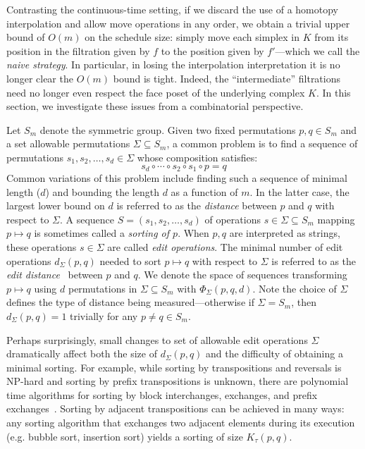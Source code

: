 \documentclass[sn-mathphys]{sn-jnl}
\begin{document}
Contrasting the continuous-time setting, if we discard the use of a homotopy interpolation and allow move operations in any order, we obtain a trivial upper bound of $O(m)$ on the schedule size:  simply move each simplex in $K$ from  its position in the filtration given by $f$ to the position given by $f'$---which we call the \emph{naive strategy}. In particular, in losing the interpolation interpretation it is no longer clear the $O(m)$ bound is tight. Indeed, the ``intermediate'' filtrations need no longer even respect the face poset of the underlying complex $K$. 
In this section, we investigate these issues from a combinatorial perspective. 


Let $S_m$ denote the symmetric group. Given two fixed permutations $p, q \in S_m$ and a set allowable permutations $\Sigma \subseteq S_m$,  a common  problem is to find a sequence of permutations $s_1, s_2, \dots, s_d \in \Sigma$ whose composition satisfies:
	\begin{equation}\label{eq:sorting}
		s_d \circ \cdots \circ s_2 \circ s_1 \circ p = q
	\end{equation}
Common variations of this problem include finding such a sequence of minimal length ($d$) and bounding the length $d$ as a function of $m$. In the latter case, the largest  lower bound on $d$ is referred to as the \emph{distance} between $p$ and $q$ with respect to $\Sigma$. 
A sequence $S = (s_1, s_2, \dots, s_d)$ of operations $s \in \Sigma \subseteq S_m$ mapping $p \mapsto q$ is sometimes called a \emph{sorting of $p$}. 
When $p, q$ are interpreted as strings, these operations $s \in \Sigma$ are called \emph{edit operations}. The minimal number of edit operations $d_\Sigma(p, q)$ needed to sort $p \mapsto q$ with respect to $\Sigma$ is referred to as the \emph{edit distance}~\cite{bergroth2000survey} between $p$ and $q$.
We denote the space of sequences transforming $p \mapsto q$ using $d$ permutations in $\Sigma \subseteq S_m$ with $\Phi_\Sigma(p,q,d)$.
Note the choice of $\Sigma$ defines the type of distance being measured---otherwise if $\Sigma = S_m$, then $d_\Sigma(p, q) = 1$ trivially for any $p\neq  q \in S_m$.

Perhaps surprisingly, small changes to set of allowable edit operations $\Sigma$ dramatically affect both the size of $d_\Sigma(p,q)$ and the difficulty of obtaining a minimal sorting. 
For example, while sorting by transpositions and reversals is NP-hard and sorting by prefix  transpositions is unknown, there are polynomial time algorithms for sorting by block interchanges, exchanges, and prefix exchanges~\cite{labarre2013lower}. Sorting by adjacent transpositions can be achieved in many ways: any sorting algorithm that exchanges two adjacent elements during its execution (e.g. bubble sort, insertion sort) yields a sorting of size $K_\tau(p, q)$.  
\end{document}
